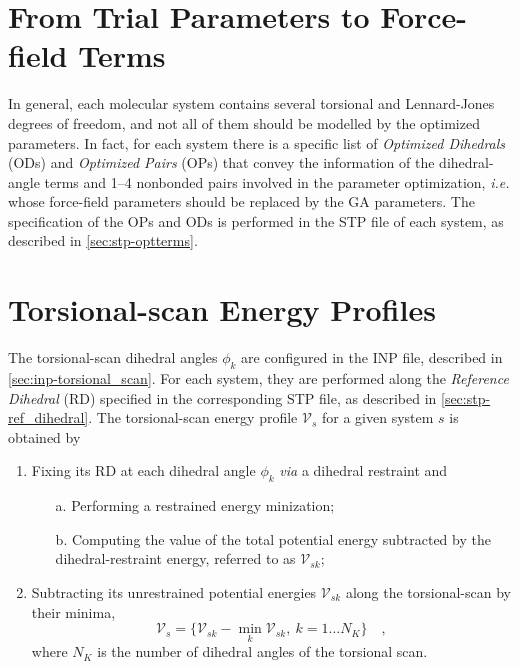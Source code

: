 \documentclass[10pt,a4paper,openany]{memoir}
\numberwithin{equation}{section}
\begin{document}
\section{From Trial Parameters to Force-field Terms}
\label{sec:ga-opt-control}

In general, each molecular system contains several torsional and
Lennard-Jones degrees of freedom, and not all of them should be
modelled by the optimized parameters. In fact, for each system there
is a specific list of \textit{Optimized Dihedrals} (ODs) and
\textit{Optimized Pairs} (OPs) that convey the information of the
dihedral-angle terms and 1--4 nonbonded pairs involved in the
parameter optimization, \textit{i.e.} whose force-field parameters
should be replaced by the GA parameters. The specification of the OPs
and ODs is performed in the STP file of each system, as described in
\autoref{sec:stp-optterms}.

\section{Torsional-scan Energy Profiles}
\label{sec:ga-tpes}

The torsional-scan dihedral angles $\phi_k$ are configured in the INP
file, described in \autoref{sec:inp-torsional_scan}. For each system,
they are performed along the \textit{Reference
  Dihedral} (RD) specified in the corresponding STP file, as described in
\autoref{sec:stp-ref_dihedral}.
The torsional-scan energy profile $\mathcal{V}_s$ for a given system $s$ is obtained by
\begin{enumerate}
\item Fixing its RD at each dihedral angle $\phi_k$ \textit{via} a dihedral restraint and
\begin{enumerate}
\item [a.] Performing a restrained energy minization;
\item [b.] Computing the value of the total potential energy subtracted by the
  dihedral-restraint energy, referred to as $\mathcal{V}_{sk}$;
\end{enumerate}
\item Subtracting its unrestrained potential energies
  $\mathcal{V}_{sk}$ along the torsional-scan by their minima,
  \begin{equation}
  \label{eq:ga-tors-scan}
  \mathcal{V}_s = \{ \mathcal{V}_{sk} - \min_k{\mathcal{V}_{sk}},\ k=1\ldots N_K \} \quad ,
\end{equation}
where $N_K$ is the number of dihedral angles of the torsional scan.
\end{enumerate}
\end{document}
